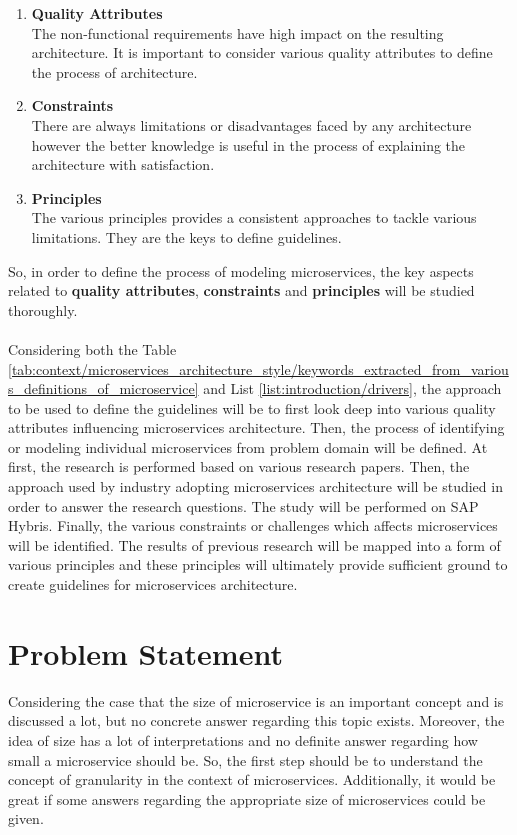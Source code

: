 \begin{enumerate}
\item \textbf{Quality Attributes}\\
The non-functional requirements have high impact on the resulting architecture. It is important to consider various quality attributes to define the process of architecture.
\item \textbf{Constraints}\\
There are always limitations or disadvantages faced by any architecture however the better knowledge is useful in the process of explaining the architecture with satisfaction.
\item \textbf{Principles}\\
The various principles provides a consistent approaches to tackle various limitations. They are the keys to define guidelines.
\end{enumerate}
So, in order to define the process of modeling microservices, the key aspects related to \textbf{quality attributes}, \textbf{constraints} and \textbf{principles} will be studied thoroughly.
\\
\\
Considering both the Table \ref{tab:context/microservices_architecture_style/keywords_extracted_from_various_definitions_of_microservice} and List \ref{list:introduction/drivers}, the approach to be used to define the guidelines will be to first look deep into various quality attributes influencing microservices architecture. Then, the process of identifying or modeling individual microservices from problem domain will be defined. At first, the research is performed based on various research papers. Then, the approach used by industry adopting microservices architecture will be studied in order to answer the research questions. The study will be performed on SAP Hybris.
Finally, the various constraints or challenges which affects microservices will be identified. 
The results of previous research will be mapped into a form of various principles and these principles will ultimately provide sufficient ground to create guidelines for microservices architecture.

\section{Problem Statement}\label{section:context/problem_statement}
Considering the case that the size of microservice is an important concept and is discussed a lot, but no concrete answer regarding this topic exists. Moreover, the idea of size has a lot of interpretations and no definite answer regarding how small a microservice should be. So, the first step should be to understand the concept of granularity in the context of microservices. Additionally, it would be great if some answers regarding the appropriate size of microservices could be given.
